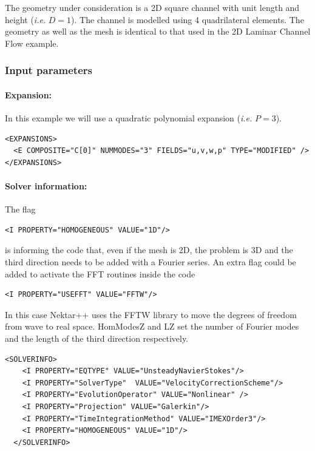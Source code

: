 The geometry under consideration is a 2D square channel with unit length and height (\textit{i.e.} $D=1$). The channel is modelled using 4 quadrilateral elements. The geometry as well as the mesh is identical to that used in the 2D Laminar Channel Flow example.

\subsubsection{Input parameters}

\paragraph{Expansion:~} In this example we will use a quadratic polynomial expansion (\textit{i.e.} $P=3$).
\begin{lstlisting}[style=XMLStyle]
<EXPANSIONS>
  <E COMPOSITE="C[0]" NUMMODES="3" FIELDS="u,v,w,p" TYPE="MODIFIED" />
</EXPANSIONS>
\end{lstlisting}

\paragraph{Solver information:~}  The flag 
\begin{lstlisting}[style=XMLStyle] 
<I PROPERTY="HOMOGENEOUS" VALUE="1D"/> 
\end{lstlisting} 
is informing the code that, even if the mesh is 2D, the problem is 3D and the third direction needs to be added with a Fourier series. An extra flag could be added to activate the FFT routines inside the code 
\begin{lstlisting}[style=XMLStyle]
<I PROPERTY="USEFFT" VALUE="FFTW"/>
\end{lstlisting} 

In this case Nektar++ uses the FFTW library to move the degrees of freedom from wave to real space. HomModesZ and LZ set the number of Fourier modes and the length of the third direction respectively.
\begin{lstlisting}[style=XMLStyle]
  <SOLVERINFO>
    <I PROPERTY="EQTYPE" VALUE="UnsteadyNavierStokes"/>
    <I PROPERTY="SolverType"  VALUE="VelocityCorrectionScheme"/>
    <I PROPERTY="EvolutionOperator" VALUE="Nonlinear" />
    <I PROPERTY="Projection" VALUE="Galerkin"/>
    <I PROPERTY="TimeIntegrationMethod" VALUE="IMEXOrder3"/>
    <I PROPERTY="HOMOGENEOUS" VALUE="1D"/>
  </SOLVERINFO>
\end{lstlisting}

